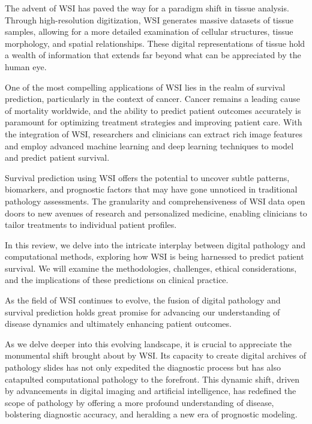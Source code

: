 \documentclass[journal,twoside,web]{ieeecolor}
\begin{document}
The advent of WSI has paved the way for a paradigm shift in tissue analysis. Through high-resolution digitization, WSI generates massive datasets of tissue samples, allowing for a more detailed examination of cellular structures, tissue morphology, and spatial relationships. These digital representations of tissue hold a wealth of information that extends far beyond what can be appreciated by the human eye.

One of the most compelling applications of WSI lies in the realm of survival prediction, particularly in the context of cancer. Cancer remains a leading cause of mortality worldwide, and the ability to predict patient outcomes accurately is paramount for optimizing treatment strategies and improving patient care. With the integration of WSI, researchers and clinicians can extract rich image features and employ advanced machine learning and deep learning techniques to model and predict patient survival.

Survival prediction using WSI offers the potential to uncover subtle patterns, biomarkers, and prognostic factors that may have gone unnoticed in traditional pathology assessments. The granularity and comprehensiveness of WSI data open doors to new avenues of research and personalized medicine, enabling clinicians to tailor treatments to individual patient profiles.

In this review, we delve into the intricate interplay between digital pathology and computational methods, exploring how WSI is being harnessed to predict patient survival. We will examine the methodologies, challenges, ethical considerations, and the implications of these predictions on clinical practice.

As the field of WSI continues to evolve, the fusion of digital pathology and survival prediction holds great promise for advancing our understanding of disease dynamics and ultimately enhancing patient outcomes.

As we delve deeper into this evolving landscape, it is crucial to appreciate the monumental shift brought about by WSI. Its capacity to create digital archives of pathology slides has not only expedited the diagnostic process but has also catapulted computational pathology to the forefront. This dynamic shift, driven by advancements in digital imaging and artificial intelligence, has redefined the scope of pathology by offering a more profound understanding of disease, bolstering diagnostic accuracy, and heralding a new era of prognostic modeling.
\end{document}
